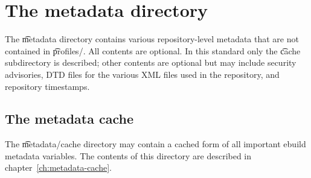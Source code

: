 \section{The metadata directory}
\label{sec:metadata-dir}

The \t{metadata} directory contains various repository-level metadata that are not contained in
\t{profiles/}. All contents are optional. In this standard only the \t{cache} subdirectory is
described; other contents are optional but may include security advisories, DTD files for the
various XML files used in the repository, and repository timestamps.

\subsection{The metadata cache}

The \t{metadata/cache} directory may contain a cached form of all important ebuild metadata
variables. The contents of this directory are described in chapter~\ref{ch:metadata-cache}.


